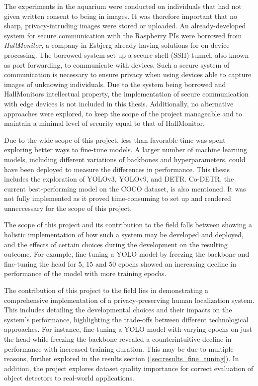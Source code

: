 The experiments in the aquarium were conducted on individuals that had not given written consent to being in images. It was therefore important that no sharp, privacy-intruding images were stored or uploaded. An already-developed system for secure communication with the Raspberry PIs were borrowed from \textit{HallMonitor}, a company in Esbjerg already having solutions for on-device processing. The borrowed system set up a secure shell (SSH) tunnel, also known as port forwarding, to communicate with devices. Such a secure system of communication is necessary to ensure privacy when using devices able to capture images of unknowing individuals. Due to the system being borrowed and HallMonitors intellectual property, the implementation of secure communication with edge devices is not included in this thesis. Additionally, no alternative approaches were explored, to keep the scope of the project manageable and to maintain a minimal level of security equal to that of HallMonitor.

Due to the wide scope of this project, less-than-favorable time was spent exploring better ways to fine-tune models. A larger number of machine learning models, including different variations of backbones and hyperparameters, could have been deployed to measure the differences in performance. This thesis includes the exploration of YOLOv3, YOLOv9, and DETR. Co-DETR, the current best-performing model on the COCO dataset, is also mentioned. It was not fully implemented as it proved time-consuming to set up and rendered unneccessary for the scope of this project. 

The scope of this project and its contribution to the field falls between showing a holistic implementation of how such a system may be developed and deployed, and the effects of certain choices during the development on the resulting outcome. For example, fine-tuning a YOLO model by freezing the backbone and fine-tuning the head for 5, 15 and 50 epochs showed an increasing decline in performance of the model with more training epochs. 

The contribution of this project to the field lies in demonstrating a comprehensive implementation of a privacy-preserving human localization system. This includes detailing the developmental choices and their impacts on the system's performance, highlighting the trade-offs between different technological approaches. For instance, fine-tuning a YOLO model with varying epochs on just the head while freezing the backbone revealed a counterintuitive decline in performance with increased training duration. This may be due to multiple reasons, further explored in the results section (\ref{sec:results_fine_tuning}). In addition, the project explores dataset quality importance for correct evaluation of object detectors to real-world applications. 

